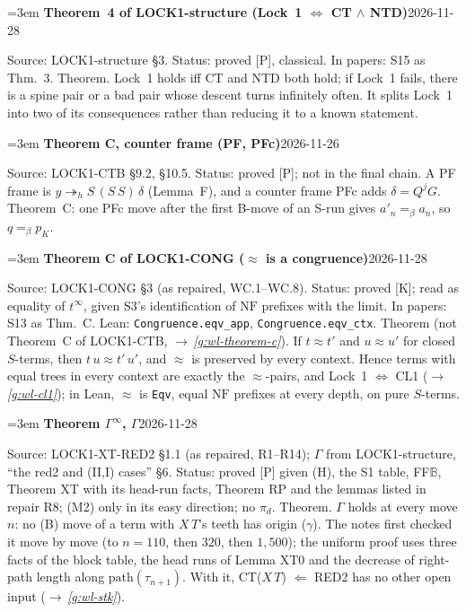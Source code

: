 \documentclass[11pt]{amsart}
\makeatletter
\newcommand{\hred}{\twoheadrightarrow_h}
\newcommand{\conv}{=_\beta}
\newcounter{sense}
\newenvironment{entry}[3]{%
  \par\addvspace{\medskipamount}\noindent\phantomsection
  \def\@currentlabel{#2}\label{#1}\setcounter{sense}{0}\raggedright\emergencystretch=3em%
  \textbf{#2}\hfill{\footnotesize\textsf{#3}}\par\nopagebreak\noindent\ignorespaces}%
  {\par}
\newcommand{\src}[1]{\textsf{Source:} #1.\enskip}
\newcommand{\lean}[1]{\textsf{Lean:} #1.\enskip}
\newcommand{\status}[1]{\textsf{Status:} #1.\enskip}
\newcommand{\appears}[1]{\textsf{In papers:} #1.\enskip}
\renewcommand{\see}[1]{$\rightarrow$\,\emph{\ref{#1}}}
\makeatother
\begin{document}
\begin{entry}{g:wl-lock1-ct-ntd}{Theorem~4 of LOCK1-structure (Lock~1 $\Leftrightarrow$ CT $\wedge$ NTD)}{2026-11-28}
\src{LOCK1-structure \S3}
\status{proved [P], classical}
\appears{S15 as Thm.~3}
Theorem. Lock~1 holds iff CT and NTD both hold; if Lock~1 fails, there is a spine pair or a bad pair
whose descent turns infinitely often. It splits Lock~1 into two of its consequences rather than
reducing it to a known statement.
\end{entry}

\begin{entry}{g:wl-theorem-c}{Theorem C, counter frame (PF, PFc)}{2026-11-26}
\src{LOCK1-CTB \S9.2, \S10.5}
\status{proved [P]; not in the final chain}
A PF frame is $y\hred S\,(S\,S)\,\delta$ (Lemma~F), and a counter frame PFc adds $\delta=Q^jG$.
Theorem~C: one PFc move after the first B-move of an S-run gives $a'_n\conv a_n$, so $q\conv p_K$.
\end{entry}

\begin{entry}{g:wl-theorem-c-cong}{Theorem C of LOCK1-CONG ($\approx$ is a congruence)}{2026-11-28}
\src{LOCK1-CONG \S3 (as repaired, WC.1--WC.8)}
\status{proved [K]; read as equality of $t^\infty$, given S3's identification of $\mathrm{NF}$ prefixes with the limit}
\appears{S13 as Thm.~C}
\lean{\texttt{Congruence.eqv\_app}, \texttt{Congruence.eqv\_ctx}}
Theorem (not Theorem~C of LOCK1-CTB, \see{g:wl-theorem-c}). If $t\approx t'$ and $u\approx u'$ for closed
$S$-terms, then $t\,u\approx t'\,u'$, and $\approx$ is preserved by every context. Hence terms with equal trees in
every context are exactly the $\approx$-pairs, and Lock~1 $\Leftrightarrow$ CL1 (\see{g:wl-cl1}); in Lean,
$\approx$ is \texttt{Eqv}, equal $\mathrm{NF}$ prefixes at every depth, on pure $S$-terms.
\end{entry}

\begin{entry}{g:wl-gamma}{Theorem $\Gamma^\infty$, $\Gamma$}{2026-11-28}
\src{LOCK1-XT-RED2 \S1.1 (as repaired, R1--R14); $\Gamma$ from LOCK1-structure, ``the red2 and (II,I) cases'' \S6}
\status{proved [P] given (H), the S1 table, FF$\mathbb B$, Theorem XT with its head-run facts, Theorem RP
and the lemmas listed in repair R8; (M2) only in its easy direction; no $\pi_d$}
Theorem. $\Gamma$ holds at every move $n$: no (B) move of a term with $X\,T$'s teeth has origin
($\gamma$). The notes first checked it move by move (to $n=110$, then $320$, then $1{,}500$); the uniform
proof uses three facts of the block table, the head runs of Lemma XT0 and the decrease of right-path
length along $\mathrm{path}(\tau_{n+1})$. With it, CT($X\,T$) $\Leftarrow$ RED2 has no other open input
(\see{g:wl-stk}).
\end{entry}
\end{document}
